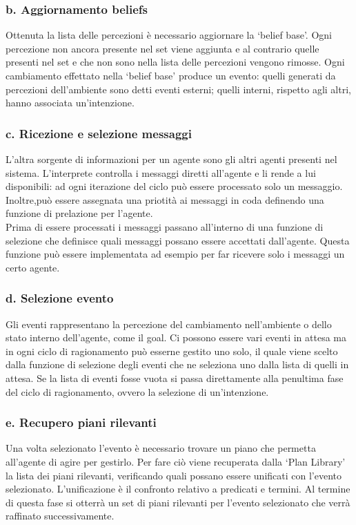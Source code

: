\subsubsection{b. Aggiornamento beliefs}
Ottenuta la lista delle percezioni \`e necessario aggiornare la `belief base'. Ogni percezione non ancora presente nel set viene aggiunta e al contrario quelle presenti nel set e che non sono nella lista delle percezioni vengono rimosse.
Ogni cambiamento effettato nella `belief base' produce un evento: quelli generati da percezioni dell'ambiente sono detti eventi esterni; quelli interni, rispetto agli altri, hanno associata un'intenzione.

\subsubsection{c. Ricezione e selezione messaggi}
L'altra sorgente di informazioni per un agente sono gli altri agenti presenti nel sistema. L'interprete controlla i messaggi diretti all'agente e li rende a lui disponibili: ad ogni iterazione del ciclo pu\`o essere processato solo un messaggio. Inoltre,pu\`o essere assegnata una priotit\`a ai messaggi in coda definendo una funzione di prelazione per l'agente.
\\
Prima di essere processati i messaggi passano all'interno di una funzione di selezione che definisce quali messaggi possano essere accettati dall'agente. Questa funzione pu\`o essere implementata ad esempio per far ricevere solo i messaggi un certo agente.

\subsubsection{d. Selezione evento}
Gli eventi rappresentano la percezione del cambiamento nell'ambiente o dello stato interno dell'agente, come il goal. Ci possono essere vari eventi in attesa ma in ogni ciclo di ragionamento pu\`o esserne gestito uno solo, il quale viene scelto dalla funzione di selezione degli eventi che ne seleziona uno dalla lista di quelli in attesa. Se la lista di eventi fosse vuota si passa direttamente alla penultima fase del ciclo di ragionamento, ovvero la selezione di un'intenzione.

\subsubsection{e. Recupero piani rilevanti}
Una volta selezionato l'evento \`e necessario trovare un piano che permetta all'agente di agire per gestirlo. Per fare ci\`o viene recuperata dalla `Plan Library' la lista dei piani rilevanti, verificando quali possano essere unificati con l'evento selezionato. L'unificazione \`e il confronto relativo a predicati e termini. Al termine di questa fase si otterr\`a un set di piani rilevanti per l'evento selezionato che verr\`a raffinato successivamente.

